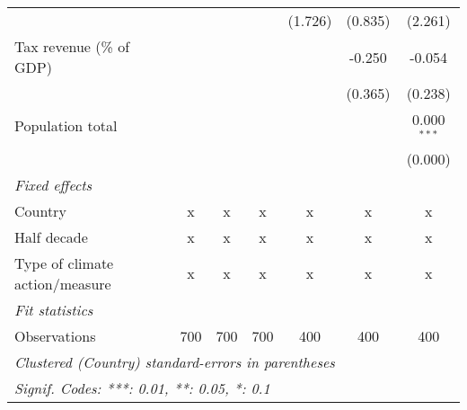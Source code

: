\begin{tabular}{lcccccc}
                                                  &               &                &                & (1.726)      & (0.835)       & (2.261)\\   
   Tax revenue (\% of GDP)                        &               &                &                &              & -0.250        & -0.054\\   
                                                  &               &                &                &              & (0.365)       & (0.238)\\   
   Population total                               &               &                &                &              &               & 0.000$^{***}$\\   
                                                  &               &                &                &              &               & (0.000)\\   
   \emph{Fixed effects}\\
   Country                                        & x             & x              & x              & x            & x             & x\\  
   Half decade                                    & x             & x              & x              & x            & x             & x\\  
   Type of climate action/measure                 & x             & x              & x              & x            & x             & x\\  
   \midrule \emph{Fit statistics}\\
   Observations                                   & 700           & 700            & 700            & 400          & 400           & 400\\  
   \midrule
   \multicolumn{7}{l}{\emph{Clustered (Country) standard-errors in parentheses}}\\
   \multicolumn{7}{l}{\emph{Signif. Codes: ***: 0.01, **: 0.05, *: 0.1}}\\
\end{tabular}
\par\endgroup


